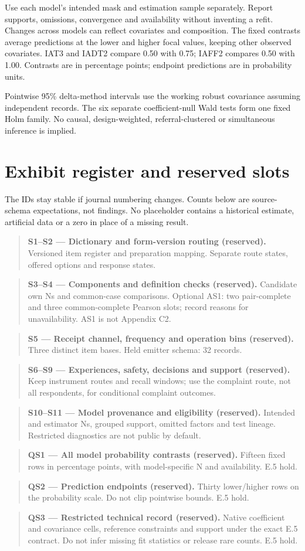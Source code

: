 \documentclass[12pt]{article}
\newcommand{\exhibitplaceholder}[3]{%
  \begin{quote}\small
    \textbf{#1 --- #2 (reserved).} #3
  \end{quote}%
}
\begin{document}
Use each model's intended mask and estimation sample separately. Report supports, omissions, convergence and availability without inventing a refit. Changes across models can reflect covariates and composition. The fixed contrasts average predictions at the lower and higher focal values, keeping other observed covariates. IAT3 and IADT2 compare 0.50 with 0.75; IAFF2 compares 0.50 with 1.00. Contrasts are in percentage points; endpoint predictions are in probability units.

Pointwise 95\% delta-method intervals use the working robust covariance assuming independent records. The six separate coefficient-null Wald tests form one fixed Holm family. No causal, design-weighted, referral-clustered or simultaneous inference is implied.

\section{Exhibit register and reserved slots}
The IDs stay stable if journal numbering changes. Counts below are source-schema expectations, not findings. No placeholder contains a historical estimate, artificial data or a zero in place of a missing result.

\exhibitplaceholder{S1--S2}{Dictionary and form-version routing}{Versioned item register and preparation mapping. Separate route states, offered options and response states.}
\exhibitplaceholder{S3--S4}{Components and definition checks}{Candidate own Ns and common-case comparisons. Optional AS1: two pair-complete and three common-complete Pearson slots; record reasons for unavailability. AS1 is not Appendix C2.}
\exhibitplaceholder{S5}{Receipt channel, frequency and operation bins}{Three distinct item bases. Held emitter schema: 32 records.}
\exhibitplaceholder{S6--S9}{Experiences, safety, decisions and support}{Keep instrument routes and recall windows; use the complaint route, not all respondents, for conditional complaint outcomes.}
\exhibitplaceholder{S10--S11}{Model provenance and eligibility}{Intended and estimator Ns, grouped support, omitted factors and test lineage. Restricted diagnostics are not public by default.}
\exhibitplaceholder{QS1}{All model probability contrasts}{Fifteen fixed rows in percentage points, with model-specific N and availability. E.5 hold.}
\exhibitplaceholder{QS2}{Prediction endpoints}{Thirty lower/higher rows on the probability scale. Do not clip pointwise bounds. E.5 hold.}
\exhibitplaceholder{QS3}{Restricted technical record}{Native coefficient and covariance cells, reference constraints and support under the exact E.5 contract. Do not infer missing fit statistics or release rare counts. E.5 hold.}
\end{document}

